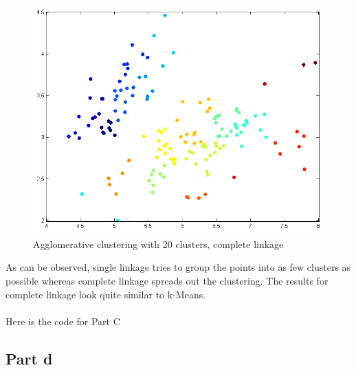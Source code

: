 \documentclass[twoside,11pt]{article}
\theoremstyle{definition}
\begin{document}
\newpage

\begin{figure}[h]
\centering
\includegraphics[width=6 in]{prob1PartC_4.png}
\caption{Agglomerative clustering with 20 clusters, complete linkage}
\end{figure}

\newpage 
As can be observed, single linkage tries to group the points into as few clusters as possible whereas complete linkage spreads out the clustering. The results for complete linkage look quite similar to k-Means. \\
\\
Here is the code for Part C\\


\newpage

\subsection*{Part d}
\end{document}
